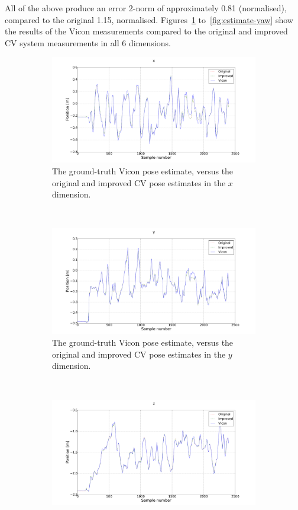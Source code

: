 All of the above produce an error 2-norm of approximately 0.81 (normalised), compared to the original 1.15, normalised. Figures~\ref{fig:estimate-x} to~\ref{fig:estimate-yaw} show the results of the Vicon measurements compared to the original and improved CV system measurements in all 6 dimensions.

\begin{figure}
  \begin{subfigure}{0.45\textwidth}
    \includegraphics[clip, trim = 200 50 150 0, width=\textwidth]{figures/chapter3/x}
    \caption{The ground-truth Vicon pose estimate, versus the original and improved CV pose estimates in the $x$ dimension.}
  \label{fig:estimate-x}
  \end{subfigure}
~
  \begin{subfigure}{0.45\textwidth}
    \includegraphics[width=\textwidth]{figures/chapter3/y}
    \caption{The ground-truth Vicon pose estimate, versus the original and improved CV pose estimates in the $y$ dimension.}
  \label{fig:estimate-y}
  \end{subfigure}
~
  \begin{subfigure}{0.45\textwidth}
    \includegraphics[width=\textwidth]{figures/chapter3/z}

\end{subfigure}
\end{figure}
